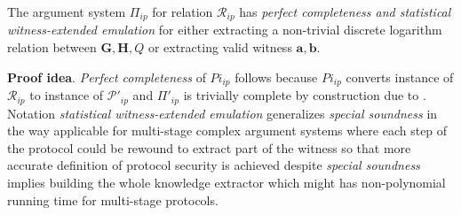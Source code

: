 \documentclass[../lecture-notes-148x210.tex]{subfiles}
\begin{document}
\begin{theorem}
    The argument system $\Pi_{ip}$ for relation $\mathcal{R}_{ip}$ has \textit{perfect completeness and statistical witness-extended emulation} for either extracting a non-trivial discrete logarithm relation between $\mathbf{G,H}, Q$ or extracting valid witness $\mathbf{a,b}$.
\end{theorem}

\textbf{Proof idea}. \textit{Perfect completeness} of $Pi_{ip}$ follows because $Pi_{ip}$ converts instance of $\mathcal{R}_{ip}$ to instance of $\mathcal{P}'_{ip}$ and $\Pi'_{ip}$ is trivially complete by construction due to . Notation \textit{statistical witness-extended emulation} generalizes \textit{special soundness} in the way applicable for multi-stage complex argument systems where each step of the protocol could be rewound to extract part of the witness so that more accurate definition of protocol security is achieved despite \textit{special soundness} implies building the whole knowledge extractor which might has non-polynomial running time for multi-stage protocols.
\end{document}
